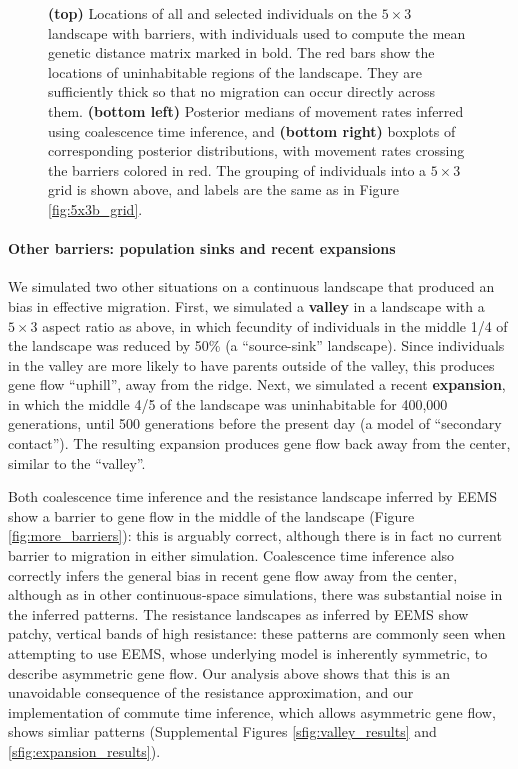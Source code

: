 \documentclass{article}
\begin{document}
\begin{figure}
    \caption{
        \textbf{(top)}
        Locations of all and selected individuals on the $5 \times 3$ landscape with barriers,
        with individuals used to compute the mean genetic distance matrix marked in bold.
        The red bars show the locations of uninhabitable regions of the landscape.
        They are sufficiently thick so that no migration can occur directly across them.
        \textbf{(bottom left)}
        Posterior medians of movement rates inferred using coalescence time inference,
        and \textbf{(bottom right)}
        boxplots of corresponding posterior distributions,
        with movement rates crossing the barriers colored in red.
        The grouping of individuals into a $5 \times 3$ grid is shown above,
        and labels are the same as in Figure \ref{fig:5x3b_grid}.
    \label{fig:5x3b_continuous}
    }
\end{figure}


\paragraph{Other barriers: population sinks and recent expansions}
We simulated two other situations on a continuous landscape that produced an bias in effective migration.
First, we simulated a \textbf{valley} in a landscape with a $5 \times 3$ aspect ratio as above, 
in which fecundity of individuals in the middle 1/4 of the landscape was reduced by 50\%
(a ``source-sink'' landscape).
Since individuals in the valley are more likely to have parents outside of the valley,
this produces gene flow ``uphill'', away from the ridge.
Next, we simulated a recent \textbf{expansion},
in which the middle 4/5 of the landscape was uninhabitable for 400,000 generations,
until 500 generations before the present day
(a model of ``secondary contact'').
The resulting expansion produces gene flow back away from the center,
similar to the ``valley''.

Both coalescence time inference and the resistance landscape inferred by EEMS
show a barrier to gene flow in the middle of the landscape (Figure \ref{fig:more_barriers}):
this is arguably correct, 
although there is in fact no current barrier to migration in either simulation.
Coalescence time inference also correctly infers 
the general bias in recent gene flow away from the center,
although as in other continuous-space simulations, 
there was substantial noise in the inferred patterns.
The resistance landscapes as inferred by EEMS show patchy, vertical bands of high resistance:
these patterns are commonly seen when attempting to use EEMS, 
whose underlying model is inherently symmetric, 
to describe asymmetric gene flow.
Our analysis above shows that this is an unavoidable consequence of the resistance approximation,
and our implementation of commute time inference,
which allows asymmetric gene flow, shows simliar patterns
(Supplemental Figures \ref{sfig:valley_results} and \ref{sfig:expansion_results}).
\end{document}
